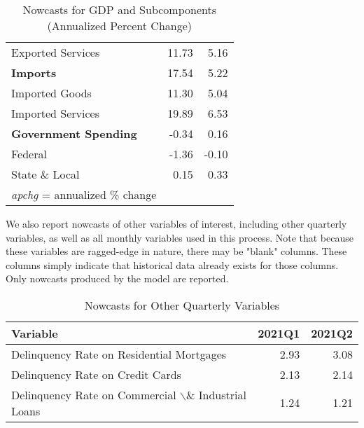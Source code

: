 \documentclass[11pt, letterpaper]{article}\usepackage[]{graphicx}\usepackage[]{color}
\begin{document}
\begin{table}[H]
\begin{tabular}{lrr}
  \hspace{8mm}  Exported Services & 11.73 & 5.16 \\ 
  \hspace{0mm} \textbf{Imports} & 17.54 & 5.22 \\ 
  \hspace{8mm}  Imported Goods & 11.30 & 5.04 \\ 
  \hspace{8mm}  Imported Services & 19.89 & 6.53 \\ 
  \hspace{0mm} \textbf{Government Spending} & -0.34 & 0.16 \\ 
  \hspace{8mm}  Federal & -1.36 & -0.10 \\ 
  \hspace{8mm}  State \& Local & 0.15 & 0.33 \\ 
   \hline 
 \textit{apchg} = annualized \% change 
\end{tabular}
\endgroup
\caption{Nowcasts for GDP and Subcomponents (Annualized Percent Change)} 
\end{table}


We also report nowcasts of other variables of interest, including other quarterly variables, as well as all monthly variables used in this process. Note that because these variables are ragged-edge in nature, there may be "blank" columns. These columns simply indicate that historical data already exists for those columns. Only nowcasts produced by the model are reported.
\begin{table}[H]
\centering
\begingroup\fontsize{11pt}{13pt}\selectfont
\begin{tabular}{lrr}
  \hline
Variable & 2021Q1 & 2021Q2 \\ 
  \hline
Delinquency Rate on Residential Mortgages & 2.93 & 3.08 \\ 
  Delinquency Rate on Credit Cards & 2.13 & 2.14 \\ 
  Delinquency Rate on Commercial $\backslash$\& Industrial Loans & 1.24 & 1.21 \\ 
   \hline
\end{tabular}
\endgroup
\caption{Nowcasts for Other Quarterly Variables} 
\end{table}
\end{document}
